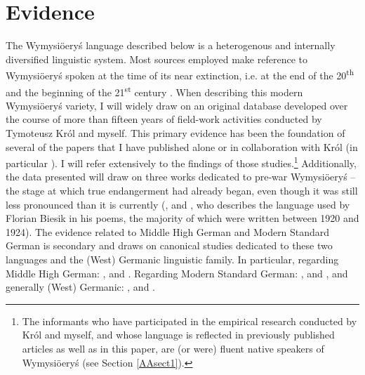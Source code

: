 \documentclass[output=paper,hidelinks]{langscibook}
\begin{document}
\section{Evidence} %
\label{sec:wymsorys:3}
The Wymysiöeryś language described below is a heterogenous and internally diversified linguistic system. Most sources employed make reference to Wymysiöeryś spoken at the time of its near extinction, i.e. at the end of the 20\textsuperscript{th} and the beginning of the 21\textsuperscript{st} century \citep{lasatowicz_deutsche_1994, wicherkiewicz_wir_1998, wicherkiewicz_making_2003, zieniukowa_sutuacja_2001, ritchie_considerations_2012, weckwerth_polands_2015, zak_influence_2016, zak2019pewnym}. When describing this modern Wymysiöeryś variety, I will widely draw on an original database developed over the course of more than fifteen years of field-work activities conducted by Tymoteusz Król and myself. This primary evidence has been the foundation of several of the papers that I have published alone or in collaboration with Król (in particular \citealt{andrason_polish_2014, andrason_szkic_2014, andrason_vilamovicean_2015, andrason_grammar_2016}). I will refer extensively to the findings of those studies.\footnote{The informants who have participated in the empirical research conducted by Król and myself, and whose language is reflected in previously published articles as well as in this paper, are (or were) fluent native speakers of Wymysiöeryś (see Section \ref{AAsect1}).} Additionally, the data presented will draw on three works dedicated to pre-war Wymysiöeryś – the stage at which true endangerment had already began, even though it was still less pronounced than it is currently (\citealt{kleczkowski_dialekt_1920, kleczkowski_dialekt_1921, mojmir_worterbuch}, and \citealt{wicherkiewicz_making_2003}, who describes the language used by Florian Biesik in his poems, the majority of which were written between 1920 and 1924). The evidence related to Middle High German and Modern Standard German is secondary and draws on canonical studies dedicated to these two languages and the (West) Germanic linguistic family. In particular, regarding Middle High German: \citet{wright_middle_1917, de_boor_mittelhochdeutsche_1973, simmler_phonetik_1985, paul_mittelhochdeutsche_2007, hennings_einfuhrung_2012}, and \citet{hall_underlying_2017}. Regarding Modern Standard German: \citet{hall_syllable_1992, hall_phonologie_2000, russ_german_1994, eisenberg_german_1994, wiese_phonology_1996, dodd_modern_2003, fox_structure_2005, johnson_exploring_2008, fagan_german_2009, caratini_vocalic_2009}, and \citet{obrein_german_2016}, and generally (West) Germanic: \citet{iverson_aspiration_1995, iverson_glottal_1999, iverson_laryngeal_2003, iverson_germanic_2008, goblirsch_voice_1997, goblirsch_lenition_2018, harbert_germanic_2007, van_der_hoek_palatalization_2010}, and \citet{van_oostendorp_germanic_2019}.
\end{document}
